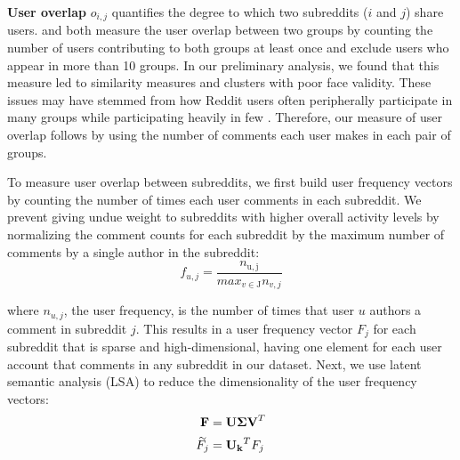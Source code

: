 \documentclass[letterpaper]{article}\usepackage[]{graphicx}\usepackage[]{color}
\renewcommand{\widetilde}[1]{\mathbin{%
    \stackrel{\sim}{\smash{#1} \rule{0pt}{1.15ex}}%
    }}
\begin{document}
\noindent \textbf{User overlap} $o_{i,j}$ quantifies the degree to which two subreddits ($i$ and $j$) share users. 
\citet{zhu_impact_2014} and \citet{wang_impact_2012} both measure the user overlap between two groups by counting the number of users contributing to both groups at least once and exclude users who appear in more than 10 groups. In our preliminary analysis, we found that this measure led to similarity measures and clusters with poor face validity.  These issues may have stemmed from how Reddit users often peripherally participate in many groups while participating heavily in few \citep{zhang_community_2017}. 
Therefore, our measure of user overlap follows \citet{datta_identifying_2017} by using the number of comments each user makes in each pair of groups.

    



To measure user overlap between subreddits, we first build user frequency vectors by counting the number of times each user comments in each subreddit. We prevent giving undue weight to subreddits with higher overall activity levels by normalizing the comment counts for each subreddit by the maximum number of comments by a single author in the subreddit:
\begin{equation}
    f_{u,j} = \frac{n_{\mathrm{u,j}}}{max_{v\in\mathrm{J}}n_{v,j}} \label{eq:user.frequency}
\end{equation}
 

\noindent where $n_{u,j}$,  the user frequency, is the number of times that user $u$ authors a comment in subreddit $j$. This results in a user frequency vector $F_j$ for each subreddit that is sparse and high-dimensional, having one element for each user account that comments in any subreddit in our dataset.
Next, we use latent semantic analysis (LSA) to reduce the dimensionality of the user frequency vectors: %
\begin{align}
    \mathbf{F} &= \mathbf{U \Sigma V}^T \\ \nonumber
    \widetilde{F_{j}} &= \mathbf{U_k}^TF_j \label{eq:user.frequency.svd}
\end{align}
\end{document}
